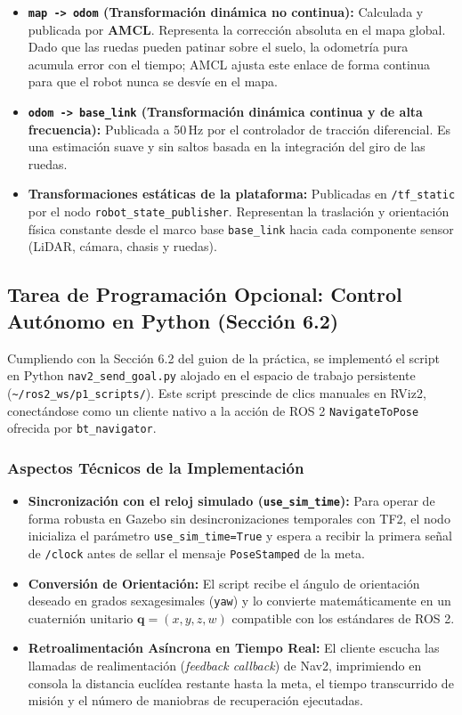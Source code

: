\documentclass[11pt,a4paper]{article}
\begin{document}
\begin{itemize}
    \item \textbf{\texttt{map -> odom} (Transformación dinámica no continua):} Calculada y publicada por \textbf{AMCL}. Representa la corrección absoluta en el mapa global. Dado que las ruedas pueden patinar sobre el suelo, la odometría pura acumula error con el tiempo; AMCL ajusta este enlace de forma continua para que el robot nunca se desvíe en el mapa.
    \item \textbf{\texttt{odom -> base\_link} (Transformación dinámica continua y de alta frecuencia):} Publicada a 50\,Hz por el controlador de tracción diferencial. Es una estimación suave y sin saltos basada en la integración del giro de las ruedas.
    \item \textbf{Transformaciones estáticas de la plataforma:} Publicadas en \texttt{/tf\_static} por el nodo \texttt{robot\_state\_publisher}. Representan la traslación y orientación física constante desde el marco base \texttt{base\_link} hacia cada componente sensor (LiDAR, cámara, chasis y ruedas).
\end{itemize}

\subsection{Tarea de Programación Opcional: Control Autónomo en Python (Sección 6.2)}

Cumpliendo con la Sección 6.2 del guion de la práctica, se implementó el script en Python \texttt{nav2\_send\_goal.py} alojado en el espacio de trabajo persistente (\texttt{\textasciitilde/ros2\_ws/p1\_scripts/}). Este script prescinde de clics manuales en RViz2, conectándose como un cliente nativo a la acción de ROS 2 \texttt{NavigateToPose} ofrecida por \texttt{bt\_navigator}.

\subsubsection{Aspectos Técnicos de la Implementación}
\begin{itemize}
    \item \textbf{Sincronización con el reloj simulado (\texttt{use\_sim\_time}):} Para operar de forma robusta en Gazebo sin desincronizaciones temporales con TF2, el nodo inicializa el parámetro \texttt{use\_sim\_time=True} y espera a recibir la primera señal de \texttt{/clock} antes de sellar el mensaje \texttt{PoseStamped} de la meta.
    \item \textbf{Conversión de Orientación:} El script recibe el ángulo de orientación deseado en grados sexagesimales (\texttt{yaw}) y lo convierte matemáticamente en un cuaternión unitario $\mathbf{q} = (x, y, z, w)$ compatible con los estándares de ROS 2.
    \item \textbf{Retroalimentación Asíncrona en Tiempo Real:} El cliente escucha las llamadas de realimentación (\textit{feedback callback}) de Nav2, imprimiendo en consola la distancia euclídea restante hasta la meta, el tiempo transcurrido de misión y el número de maniobras de recuperación ejecutadas.
\end{itemize}
\end{document}
